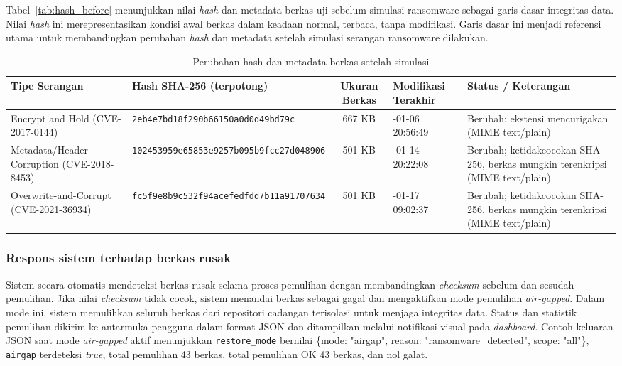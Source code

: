 \documentclass{iaesarticle}
\begin{document}
Tabel~\ref{tab:hash_before} menunjukkan nilai \textit{hash} dan metadata berkas uji sebelum simulasi ransomware sebagai garis dasar integritas data. Nilai \textit{hash} ini merepresentasikan kondisi awal berkas dalam keadaan normal, terbaca, tanpa modifikasi. Garis dasar ini menjadi referensi utama untuk membandingkan perubahan \textit{hash} dan metadata setelah simulasi serangan ransomware dilakukan.

\begin{table}[H]
\centering
\fontsize{8pt}{10pt}\selectfont
\caption{Perubahan hash dan metadata berkas setelah simulasi}
\label{tab:hash_after}
\begin{tabularx}{\textwidth}{@{}p{2.3cm} >{\raggedright\arraybackslash}X c >{\raggedright\arraybackslash}p{2.2cm} >{\raggedright\arraybackslash}X@{}}
\hline
\textbf{Tipe Serangan} & \textbf{Hash SHA-256 (terpotong)} & \textbf{Ukuran Berkas} & \textbf{Modifikasi Terakhir} & \textbf{Status / Keterangan} \\
\hline
Encrypt and Hold (CVE-2017-0144) & \texttt{2eb4e7bd18f290\-b66150a0d0d49\-bd79c} & 667 KB & 2026-01-06 20:56:49 & Berubah; ekstensi mencurigakan (MIME text/plain) \\
Metadata/Header Corruption (CVE-2018-8453) & \texttt{102453959e6585\-3e9257b095b9\-fcc27d048906} & 501 KB & 2026-01-14 20:22:08 & Berubah; ketidakcocokan SHA-256, berkas mungkin terenkripsi (MIME text/plain) \\
Overwrite-and-Corrupt (CVE-2021-36934) & \texttt{fc5f9e8b9c532f\-94acefedfdd7\-b11a91707634} & 501 KB & 2026-01-17 09:02:37 & Berubah; ketidakcocokan SHA-256, berkas mungkin terenkripsi (MIME text/plain) \\
\hline
\end{tabularx}
\end{table}

\subsubsection{Respons sistem terhadap berkas rusak}
Sistem secara otomatis mendeteksi berkas rusak selama proses pemulihan dengan membandingkan \textit{checksum} sebelum dan sesudah pemulihan. Jika nilai \textit{checksum} tidak cocok, sistem menandai berkas sebagai gagal dan mengaktifkan mode pemulihan \textit{air-gapped}. Dalam mode ini, sistem memulihkan seluruh berkas dari repositori cadangan terisolasi untuk menjaga integritas data. Status dan statistik pemulihan dikirim ke antarmuka pengguna dalam format JSON dan ditampilkan melalui notifikasi visual pada \textit{dashboard}. Contoh keluaran JSON saat mode \textit{air-gapped} aktif menunjukkan \texttt{restore\_mode} bernilai \{mode: "airgap", reason: "ransomware\_detected", scope: "all"\}, \texttt{airgap} terdeteksi \textit{true}, total pemulihan 43 berkas, total pemulihan OK 43 berkas, dan nol galat.
\end{document}

